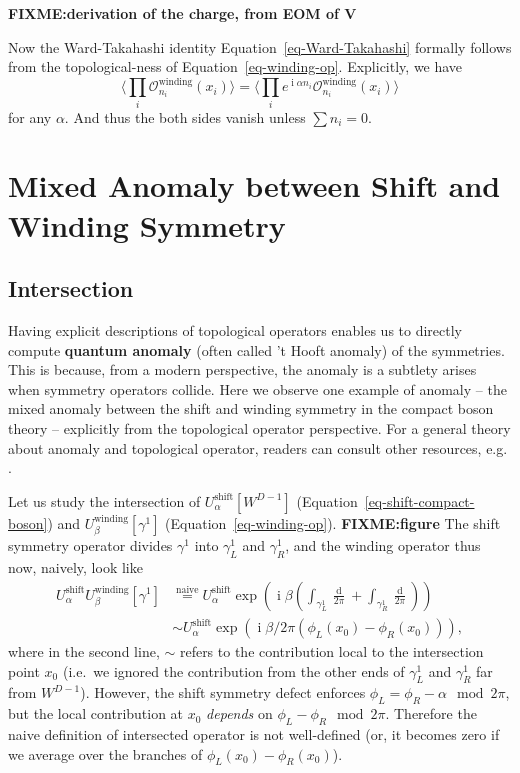 \documentclass[
  letterpaper,
  DIV=11,
  numbers=noendperiod]{scrreport}
\DeclareMathOperator{\imunit}{i}
\newcommand{\stdim}{D}
\begin{document}
\textbf{FIXME:derivation of the charge, from EOM of V}

Now the Ward-Takahashi identity Equation~\ref{eq-Ward-Takahashi}
formally follows from the topological-ness of
Equation~\ref{eq-winding-op}. Explicitly, we have \[
\langle \prod_i \mathcal{O}^\text{winding}_{n_i}(x_i)\rangle 
=
\langle \prod_i e^{\imunit \alpha n_i} \mathcal{O}^\text{winding}_{n_i}(x_i)\rangle 
\] for any \(\alpha\). And thus the both sides vanish unless
\(\sum n_i = 0\).

\hypertarget{mixed-anomaly-between-shift-and-winding-symmetry}{%
\section{Mixed Anomaly between Shift and Winding
Symmetry}\label{mixed-anomaly-between-shift-and-winding-symmetry}}

\hypertarget{intersection}{%
\subsection{Intersection}\label{intersection}}

Having explicit descriptions of topological operators enables us to
directly compute \textbf{quantum anomaly} (often called 't Hooft
anomaly) of the symmetries. This is because, from a modern perspective,
the anomaly is a subtlety arises when symmetry operators collide. Here
we observe one example of anomaly -- the mixed anomaly between the shift
and winding symmetry in the compact boson theory -- explicitly from the
topological operator perspective. For a general theory about anomaly and
topological operator, readers can consult other resources, e.g.
\textcite{TachikawaTasi}.

Let us study the intersection of \(U_\alpha^\text{shift}[W^{\stdim-1}]\)
(Equation~\ref{eq-shift-compact-boson}) and
\(U_\beta^\text{winding}[\gamma^1]\) (Equation~\ref{eq-winding-op}).
\textbf{FIXME:figure} The shift symmetry operator divides \(\gamma^1\)
into \(\gamma^1_L\) and \(\gamma^1_R\), and the winding operator thus
now, naively, look like \[
\begin{aligned}
U^\text{shift}_\alpha U^\text{winding}_\beta[\gamma^1] &\stackrel{\text{naive}}{=} U^\text{shift}_\alpha \exp\left(\imunit\beta \left(\int_{\gamma^1_L}\frac{\mathop{d\phi_L}}{2\pi} + \int_{\gamma^1_R}\frac{\mathop{d\phi_R}}{2\pi}\right)\right)\\
& \sim U^\text{shift}_\alpha \exp\left(\imunit\beta/2\pi (\phi_L(x_0) - \phi_R(x_0)) \right),
\end{aligned}
\] where in the second line, \(\sim\) refers to the contribution local
to the intersection point \(x_0\) (i.e.~we ignored the contribution from
the other ends of \(\gamma^1_L\) and \(\gamma^1_R\) far from
\(W^{\stdim-1}\)). However, the shift symmetry defect enforces
\(\phi_L = \phi_R - \alpha \mod 2\pi\), but the local contribution at
\(x_0\) \emph{depends} on \(\phi_L-\phi_R \mod 2\pi\). Therefore the
naive definition of intersected operator is not well-defined (or, it
becomes zero if we average over the branches of
\(\phi_L(x_0) -\phi_R(x_0)\)).
\end{document}
